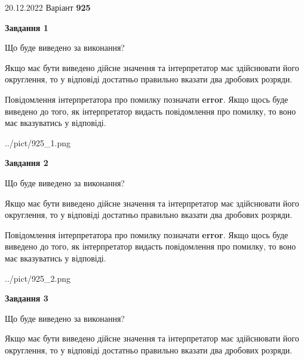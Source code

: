 \documentclass[12pt, ukrainian]{article}
\begin{document}
{20.12.2022 Варіант \No \textbf { 925 }\par}
{
\begin {Large}

{\begin {center}\textbf{Завдання 1}\end {center}}\par
Що буде виведено за виконання? \par

Якщо має бути виведено дійсне значення та інтерпретатор має здійснювати його округлення, 
то у відповіді достатньо правильно вказати два дробових розряди.

Повідомлення інтерпретатора про помилку позначати \textbf{error}.
Якщо щось буде виведено до того, як інтерпретатор видасть повідомлення про помилку, 
то воно має вказуватись у відповіді. \par

\begin{center}
	{../pict/925_1.png}
\end{center}
\newpage

{\begin {center}\textbf{Завдання 2}\end {center}}\par
Що буде виведено за виконання? \par

Якщо має бути виведено дійсне значення та інтерпретатор має здійснювати його округлення, 
то у відповіді достатньо правильно вказати два дробових розряди.

Повідомлення інтерпретатора про помилку позначати \textbf{error}.
Якщо щось буде виведено до того, як інтерпретатор видасть повідомлення про помилку, 
то воно має вказуватись у відповіді. \par

\begin{center}
	{../pict/925_2.png}
\end{center}
\newpage

{\begin {center}\textbf{Завдання 3}\end {center}}\par
Що буде виведено за виконання? \par

Якщо має бути виведено дійсне значення та інтерпретатор має здійснювати його округлення, 
то у відповіді достатньо правильно вказати два дробових розряди.


\end{Large}}
\end{document}
